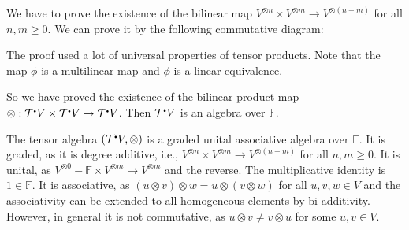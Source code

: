 \documentclass[
	11pt, %
	fleqn, %
	a4paper, %
]{LegrandOrangeBook}
\newcommand{\smallbullet}{\scalebox{0.5}{$\bullet$}}
\renewcommand{\bar}[1]{\overline{#1}} %
\newcommand{\F}{\mathbb{F}} %
\newcommand{\T}{\mathcal{T}^{\smallbullet}} %
\begin{document}
We have to prove the existence of the bilinear map $V^{\otimes n} \times V^{\otimes m} \to V^{\otimes (n + m)}$ for all $n, m \geq 0$. We can prove it by the following commutative diagram:
\begin{center}
\end{center}
The proof used a lot of universal properties of tensor products. Note that the map $\phi$ is a multilinear map and $\bar{\phi}$ is a linear equivalence.

So we have proved the existence of the bilinear product map $\otimes : \T V \times \T V \to \T V$. Then $\T V$ is an algebra over $\F$.

\begin{remark}
    The tensor algebra $(\T V, \otimes)$ is a graded unital associative algebra over $\F$. It is graded, as it is degree additive, i.e., $V^{\otimes n} \times V^{\otimes m} \to V^{\otimes (n + m)}$ for all $n, m \geq 0$. It is unital, as $V^{\otimes 0} - \F \times V^{\otimes m} \to V^{\otimes m}$ and the reverse. The multiplicative identity is $1 \in \F$. It is associative, as $(u \otimes v) \otimes w = u \otimes (v \otimes w)$ for all $u, v, w \in V$ and the associativity can be extended to all homogeneous elements by bi-additivity. However, in general it is not commutative, as $u \otimes v \neq v \otimes u$ for some $u, v \in V$.
\end{remark}
\end{document}
